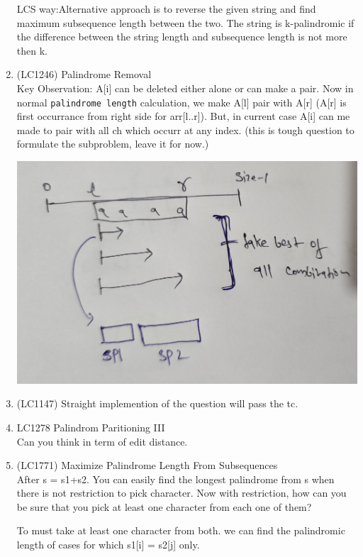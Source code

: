 \begin{exerciseHints}
\begin{enumerate}
        LCS way:Alternative approach is to reverse the given string and find maximum subsequence length between the two. The string is k-palindromic if the difference between the string length and subsequence length is not more then k.
        
        \item (LC1246) Palindrome Removal \\Key Observation: A[i] can be deleted either alone or can make a pair. Now in normal \verb|palindrome length| calculation, we make A[l] pair with A[r] (A[r] is first occurrance from right side for arr[l..r]). But, in current case A[i] can me made to pair with all ch which occurr at any index.
        (this is tough question to formulate the subproblem, leave it for now.)
        
        \includegraphics[width=\marginparwidth]{./resources/LC1246_p1.jpg}

        \item (LC1147) Straight implemention of the question will pass the tc.
        
        \item LC1278 Palindrom Paritioning III \\ Can you think in term of edit distance.
        
        \item (LC1771) Maximize Palindrome Length From Subsequences\\ After s = s1+s2. You can easily find the longest palindrome from s when there is not restriction to pick character.
        Now with restriction, how can you be sure that you pick at least one character from each one of them?

        To must take at least one character from both. we can find the palindromic length of cases for which s1[i] = s2[j] only.


\end{enumerate}
\end{exerciseHints}
